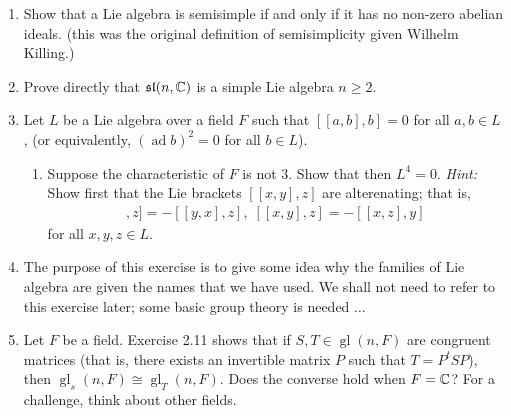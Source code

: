 \documentclass[12pt,a4paper]{report}
\newcommand{\GL}{\operatorname{gl}}
\newcommand{\AD}{\operatorname{ad}}
\begin{document}
\begin{enumerate}[label=4.\arabic*]
\item Show that a Lie algebra is semisimple if and only if it has no non-zero abelian ideals.  (this was the original definition of semisimplicity given Wilhelm Killing.)

\item Prove directly that $\mathfrak{sl}(n,\mathbb{C})$ is a simple Lie algebra $n \ge 2$.

\item Let $L$ be a Lie algebra over a field $F$ such that $[[a,b],b]=0$ for all $a,b \in L$, (or equivalently, $(\AD b)^2=0$ for all $b \in L$).

\begin{enumerate}[label=(\roman*)]

	\item Suppose the characteristic of $F$ is not 3.  Show that then $L^4 = 0$.  \textit{Hint:}  Show first that the Lie brackets $[[x,y],z]$ are alterenating; that is, 
	\begin{align*}
		[[x,y],z]=-[[y,x],z],\; [[x,y],z]=-[[x,z],y]
	\end{align*}for all $x,y,z \in L$.

\end{enumerate}

\item The purpose of this exercise is to give some idea why the families of Lie algebra are given the names that we have used.  We shall not need to refer to this exercise later;  some basic group theory is needed $\dots$

\item Let $F$ be a field.  Exercise 2.11 shows that if $S,T \in \GL(n,F)$ are congruent matrices (that is, there exists an invertible matrix $P$ such that $T=P^tSP$), then $\GL_s(n,F) \cong \GL_T(n,F)$.  Does the converse hold when $F = \mathbb{C}$?  For a challenge, think about other fields.
\end{enumerate}
\end{document}
